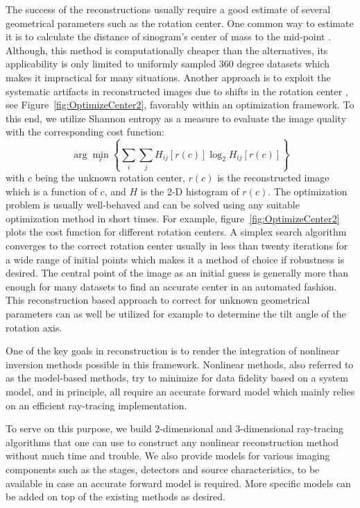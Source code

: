 \documentclass[pdf]{iucr}              %
\begin{document}
The success of the reconstructions usually require a good estimate of several geometrical parameters such as the rotation center. One common way to estimate it is to calculate the distance of sinogram's center of mass to the mid-point \cite{Azevedo}. Although, this method is computationally cheaper than the alternatives, its applicability is only limited to uniformly sampled 360 degree datasets which makes it impractical for many situations. Another approach is to exploit the systematic artifacts in reconstructed images due to shifts in the rotation center \cite{donath_spie_2006}, see Figure~\ref{fig:OptimizeCenter2}, favorably within an optimization framework. To this end, we utilize Shannon entropy as a measure to evaluate the image quality with the corresponding cost function:
\begin{equation}
\arg \min_c \left\{\sum_i \sum_jH_{ij}\left[r(c)\right]\log_2 H_{ij}\left[r(c)\right]\right\}
\end{equation}
with $c$ being the unknown rotation center, $r(c)$ is the reconstructed image which is a function of $c$, and $H$ is the 2-D histogram of $r(c)$. The optimization problem is usually well-behaved and can be solved using any suitable optimization method in short times. For example, figure~\ref{fig:OptimizeCenter2} plots the cost function for different rotation centers. A simplex search algorithm converges to the correct rotation center usually in less than twenty iterations for a wide range of initial points which makes it a method of choice if robustness is desired. The central point of the image as an initial guess is generally more than enough for many datasets to find an accurate center in an automated fashion. This reconstruction based approach to correct for unknown geometrical parameters can as well be utilized for example to determine the tilt angle of the rotation axis.

One of the key goals in reconstruction is to render the integration of nonlinear inversion methods possible in this framework. Nonlinear methods, also referred to as the model-based methods, try to minimize for data fidelity based on a system model, and in principle, all require an accurate forward model which mainly relies on an efficient ray-tracing implementation. 

To serve on this purpose, we build 2-dimensional and 3-dimensional ray-tracing algorithms that one can use to construct any nonlinear reconstruction method without much time and trouble. We also provide models for various imaging components such as the stages, detectors and source characteristics, to be available in case an accurate forward model is required. More specific models can be added on top of the existing methods as desired.
\end{document}
